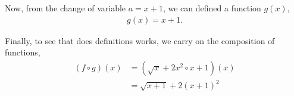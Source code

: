 \begin{preguntas}
\begin{center}
{\begin{minipage}{0.85\textwidth}
    Now, from the change of variable $a=x+1$, we can defined a function $g(x)$,
    \begin{gather*}
        \boxed{g(x) = x+1.}
    \end{gather*}

    Finally, to see that does definitions works, we carry on the composition of functions,
    \begin{align*}
        (f\circ g)(x) &= (\sqrt{x}+2x^2 \circ x+1)(x) \\
        &= \sqrt{x+1}+2(x+1)^2
    \end{align*}
    
    \end{minipage}
    }
\end{center}


\end{preguntas}


